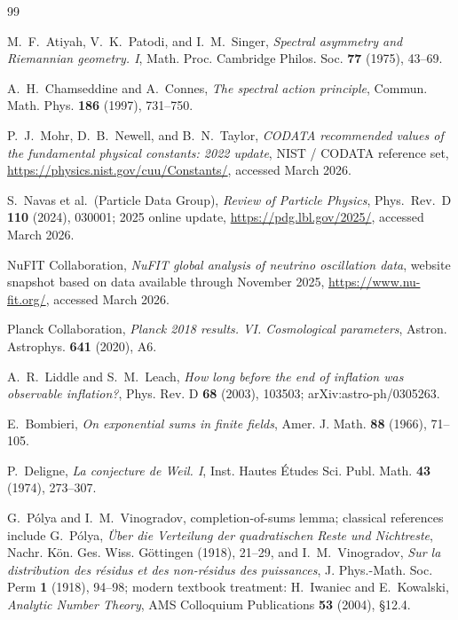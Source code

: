 \begin{thebibliography}{99}

M.~F.~Atiyah, V.~K.~Patodi, and I.~M.~Singer,
\newblock \emph{Spectral asymmetry and Riemannian geometry. I},
\newblock Math. Proc. Cambridge Philos. Soc. \textbf{77} (1975), 43--69.

A.~H.~Chamseddine and A.~Connes,
\newblock \emph{The spectral action principle},
\newblock Commun. Math. Phys. \textbf{186} (1997), 731--750.

P.~J.~Mohr, D.~B.~Newell, and B.~N.~Taylor,
\newblock \emph{CODATA recommended values of the fundamental physical constants: 2022 update},
\newblock NIST / CODATA reference set, \url{https://physics.nist.gov/cuu/Constants/}, accessed March 2026.

S.~Navas et al.\ (Particle Data Group),
\newblock \emph{Review of Particle Physics},
\newblock Phys.\ Rev.\ D \textbf{110} (2024), 030001; 2025 online update, \url{https://pdg.lbl.gov/2025/}, accessed March 2026.

NuFIT Collaboration,
\newblock \emph{NuFIT global analysis of neutrino oscillation data},
\newblock website snapshot based on data available through November 2025, \url{https://www.nu-fit.org/}, accessed March 2026.

Planck Collaboration,
\newblock \emph{Planck 2018 results. VI. Cosmological parameters},
\newblock Astron. Astrophys. \textbf{641} (2020), A6.

A.~R.~Liddle and S.~M.~Leach,
\newblock \emph{How long before the end of inflation was observable inflation?},
\newblock Phys. Rev. D \textbf{68} (2003), 103503; arXiv:astro-ph/0305263.

E.~Bombieri,
\newblock \emph{On exponential sums in finite fields},
\newblock Amer. J. Math. \textbf{88} (1966), 71--105.

P.~Deligne,
\newblock \emph{La conjecture de Weil. I},
\newblock Inst. Hautes \'Etudes Sci. Publ. Math. \textbf{43} (1974), 273--307.

G.~P\'olya and I.~M.~Vinogradov,
\newblock completion-of-sums lemma; classical references include
G.~P\'olya, \emph{\"Uber die Verteilung der quadratischen Reste und Nichtreste},
Nachr. K\"on. Ges. Wiss. G\"ottingen (1918), 21--29, and
I.~M.~Vinogradov, \emph{Sur la distribution des r\'esidus et des non-r\'esidus des puissances},
J. Phys.-Math. Soc. Perm \textbf{1} (1918), 94--98; modern textbook treatment:
H.~Iwaniec and E.~Kowalski, \emph{Analytic Number Theory},
AMS Colloquium Publications \textbf{53} (2004), \S 12.4.


\end{thebibliography}
